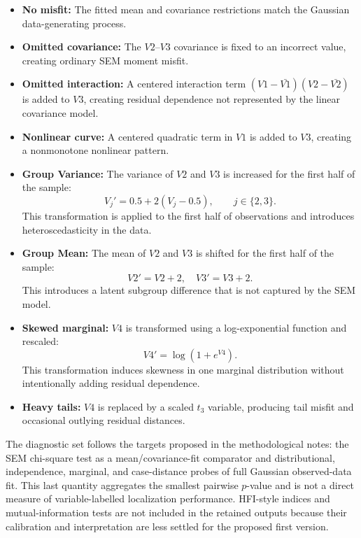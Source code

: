 \documentclass[floatsintext,a4paper]{apa7} %
\begin{document}
	\begin{itemize}
		\item \textbf{No misfit:} The fitted mean and covariance restrictions match the Gaussian data-generating process.
		
		\item \textbf{Omitted covariance:} The $V2$--$V3$ covariance is fixed to an incorrect value, creating ordinary SEM moment misfit.
		
		\item \textbf{Omitted interaction:} A centered interaction term $ (V1-\bar{V1})(V2-\bar{V2}) $ is added to $ V3 $, creating residual dependence not represented by the linear covariance model.
		
		\item \textbf{Nonlinear curve:} A centered quadratic term in $V1$ is added to $V3$, creating a nonmonotone nonlinear pattern.
		
		\item \textbf{Group Variance:} The variance of $ V2 $ and $ V3 $ is increased for the first half of the sample:
		$$
		V_j'=0.5+2(V_j-0.5),\qquad j\in\{2,3\}.
		$$
		This transformation is applied to the first half of observations and introduces heteroscedasticity in the data.
		
		\item \textbf{Group Mean:} The mean of $ V2 $ and $ V3 $ is shifted for the first half of the sample:
		$$
		V2' = V2 + 2, \quad V3' = V3 + 2.
		$$
		This introduces a latent subgroup difference that is not captured by the SEM model.
		
		\item \textbf{Skewed marginal:} $ V4 $ is transformed using a log-exponential function and rescaled:
		$$
		V4' = \log(1 + e^{V4}).
		$$
		This transformation induces skewness in one marginal distribution without intentionally adding residual dependence.
		
		\item \textbf{Heavy tails:} $ V4 $ is replaced by a scaled $t_3$ variable, producing tail misfit and occasional outlying residual distances.
	\end{itemize}
	
	The diagnostic set follows the targets proposed in the methodological notes: the SEM chi-square test as a mean/covariance-fit comparator and distributional, independence, marginal, and case-distance probes of full Gaussian observed-data fit. This last quantity aggregates the smallest pairwise $p$-value and is not a direct measure of variable-labelled localization performance. HFI-style indices and mutual-information tests are not included in the retained outputs because their calibration and interpretation are less settled for the proposed first version.
\end{document}
